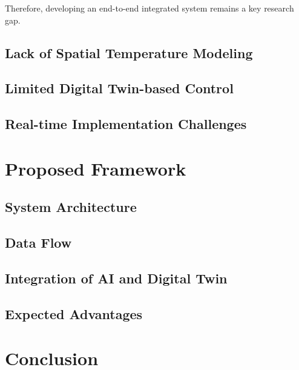 \documentclass[12pt,a4paper]{article}
\begin{document}
                Therefore, developing an end-to-end integrated system remains a key research gap.
    
    \subsection{Lack of Spatial Temperature Modeling}
    \subsection{Limited Digital Twin-based Control}
    \subsection{Real-time Implementation Challenges}

\section{Proposed Framework}

    \subsection{System Architecture}
    \subsection{Data Flow}
    \subsection{Integration of AI and Digital Twin}
    \subsection{Expected Advantages}

\section{Conclusion}
\end{document}
